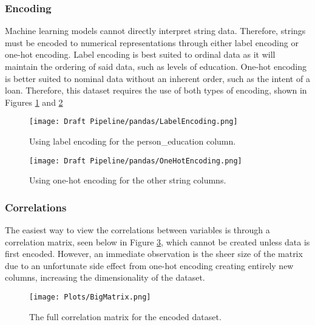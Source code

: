 \subsubsection{Encoding}
Machine learning models cannot directly interpret string data. Therefore, strings must be encoded to numerical representations
through either label encoding or one-hot encoding. Label encoding is best suited to ordinal data as it will maintain the ordering 
of said data, such as levels of education. One-hot encoding is better suited to nominal data without an inherent order, such as 
the intent of a loan. Therefore, this dataset requires the use of both types of encoding, shown in Figures \ref{fig:LabelEncoding}
and \ref{fig:OneHotEncoding}


\begin{figure}[H]
    \centering
    \texttt{[image: Draft Pipeline/pandas/LabelEncoding.png]}
    \caption{Using label encoding for the person\_education column.}
    \label{fig:LabelEncoding}
\end{figure}

\begin{figure}[H]
    \centering
    \texttt{[image: Draft Pipeline/pandas/OneHotEncoding.png]}
    \caption{Using one-hot encoding for the other string columns.}
    \label{fig:OneHotEncoding}
\end{figure}

\subsubsection{Correlations}
The easiest way to view the correlations between variables is through a correlation matrix, seen below in Figure \ref{fig:BigMatrix}, which 
cannot be created unless data is first encoded. However, an immediate observation is the sheer size of the matrix due to an unfortunate side 
effect from one-hot encoding creating entirely new columns, increasing the dimensionality of the dataset. 

\begin{figure}[H]
    \centering
    \texttt{[image: Plots/BigMatrix.png]}
    \caption{The full correlation matrix for the encoded dataset.}
    \label{fig:BigMatrix}
\end{figure}


